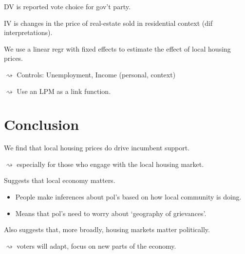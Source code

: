 \documentclass[aspectratio=169]{beamer}
\begin{document}
\begin{frame} 
	DV is reported vote choice for gov't party. \pause
	
	\vspace{0.2in} 
	IV is changes in the price of real-estate sold in residential context (dif interpretations).
	\vspace{0.2in}  \pause
	
	We use a linear regr with fixed effects to estimate the effect of local housing prices. \pause
	
	$\rightsquigarrow$ Controls: Unemployment, Income (personal, context) \pause
	
	$\rightsquigarrow$ Use an LPM as a link function. 
	
	
\end{frame}


\section{Conclusion}

\begin{frame}
We find that local housing prices do drive incumbent support. \pause

$\rightsquigarrow$ especially for those who engage with the local housing market. \pause

\vspace{0.2in}
Suggests that local economy matters. \pause
\begin{itemize}[<+->]
	\item People make inferences about pol's based on how local community is doing.
	\item Means that pol's need to worry about `geography of grievances'.
\end{itemize}

\vspace{0.2in} \pause
Also suggests that, more broadly, housing markets matter politically.

$\rightsquigarrow$ voters will adapt, focus on new parts of the economy. 
\end{frame}
\end{document}
